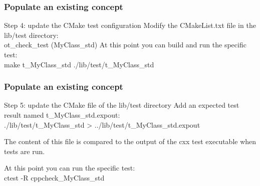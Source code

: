 \documentclass[8pt]{beamer}
\begin{document}
\begin{frame}
  \frametitle{Populate an existing concept}
  \begin{block}{Step 4: update the CMake test configuration}
    Modify the CMakeList.txt file in the lib/test directory:\\
    {\ttfamily ot\_check\_test (MyClass\_std)}
    At this point you can build and run the specific test:\\
     {\ttfamily make t\_MyClass\_std}
     \newline
     {\ttfamily ./lib/test/t\_MyClass\_std}
  \end{block}
  
\end{frame}
\begin{frame}
  \frametitle{Populate an existing concept}
  \begin{block}{Step 5: update the CMake file of the lib/test directory}
    Add an expected test result named t\_MyClass\_std.expout:\\
    {\ttfamily ./lib/test/t\_MyClass\_std > ../lib/test/t\_MyClass\_std.expout}
    
    The content of this file is compared to the output of the cxx test executable when tests are run.

    At this point you can run the specific test:\\
     {\ttfamily ctest -R cppcheck\_MyClass\_std}
  \end{block}
\end{frame}
\end{document}
